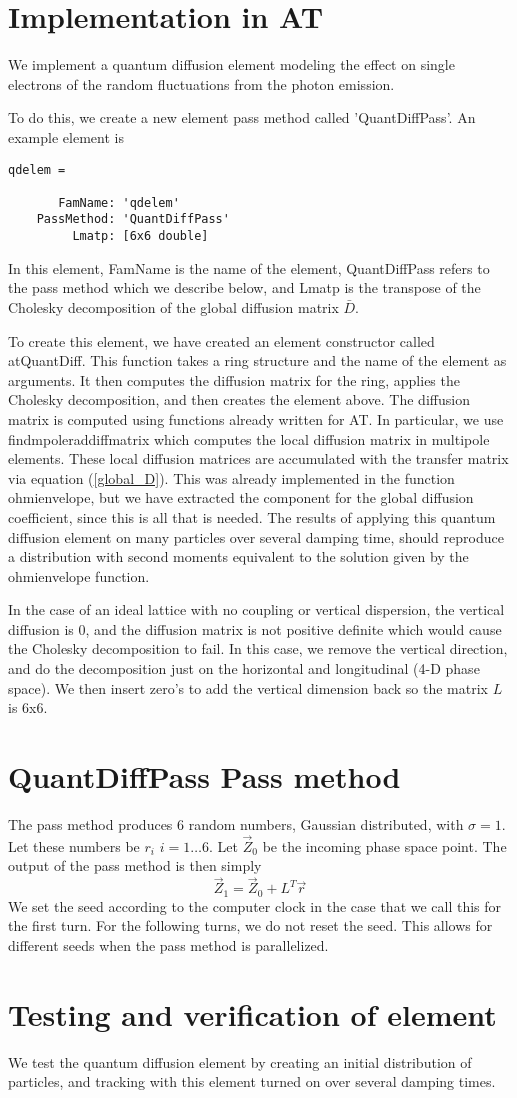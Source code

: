 \documentclass[a4paper,10pt]{article}
\begin{document}
\section{Implementation in AT}

We implement a quantum diffusion element modeling the effect on single electrons of the random fluctuations
from the photon emission.

To do this, we create a new element pass method called 'QuantDiffPass'.  An example element is
\begin{verbatim}
qdelem = 

       FamName: 'qdelem'
    PassMethod: 'QuantDiffPass'
         Lmatp: [6x6 double]
\end{verbatim}

In this element, FamName is the name of the element, QuantDiffPass refers to the pass method which we describe below, and Lmatp is
the transpose of the Cholesky decomposition of the global diffusion matrix $\bar D$.

To create this element, we have created an element constructor called atQuantDiff.  This function takes a ring structure and the name of the element as arguments.  It then computes the diffusion matrix for the ring, applies the Cholesky decomposition, and then creates the element above.
The diffusion matrix is computed using functions already written for AT.  In particular, we use findmpoleraddiffmatrix which computes the local diffusion matrix in multipole elements.  These local diffusion matrices are accumulated with the transfer matrix via equation (\ref{global_D}).  This was already implemented in the function ohmienvelope, but we have extracted the component for the global diffusion coefficient, since this is all that is needed.  The results of applying this quantum diffusion element on many particles over several damping time, should reproduce a distribution with second moments equivalent to the solution given by the ohmienvelope function.

In the case of an ideal lattice with no coupling or vertical dispersion, the vertical diffusion is 0, and the diffusion matrix is not positive definite which would cause the Cholesky decomposition to fail.  In this case, we remove the vertical direction, and do the decomposition just on the horizontal and longitudinal (4-D phase space).  We then insert zero's to add the vertical dimension back so the matrix $L$ is 6x6.

\section{QuantDiffPass Pass method}
The pass method produces 6 random numbers, Gaussian distributed, with $\sigma=1$.  Let these numbers be $r_i$ $i=1\dots 6$.
Let $\vec Z_0$ be the incoming phase space point.  The output of the pass method is then simply
\begin{equation}
\vec Z_1 = \vec Z_0 + L^T \vec r
\end{equation}
We set the seed according to the computer clock in the case that we call this for the first turn.  For the following turns, we do not reset the
seed.  This allows for different seeds when the pass method is parallelized. 

\section{Testing and verification of element}
We test the quantum diffusion element by creating an initial distribution of particles, and tracking with this element turned on over several damping times.
\end{document}
